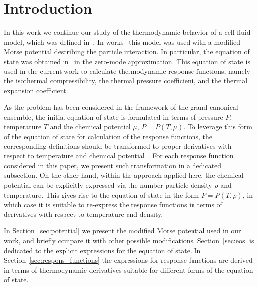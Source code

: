 \section{Introduction}

In this work we continue our study of the thermodynamic behavior of a cell fluid model, which was defined in~\cite{KozitskyKozlovskiiDobush2018book,KozitskyKozlovskiiDobush2020}. In works~\cite{KozlovskiiDobush2020,PylyukDobush2020,PylyukEtAlJML2023,PylyukKozlovskiiDobushUJP2023b} this model was used with a modified Morse potential describing the particle interaction. In particular, the equation of state was obtained in~\cite{KozlovskiiDobush2020} in the zero-mode approximation. This equation of state is used in the current work to calculate thermodynamic response functions, namely the isothermal compressibility, the thermal pressure coefficient, and the thermal expansion coefficient. 

As the problem has been considered in the framework of the grand canonical ensemble, the initial equation of state is formulated in terms of pressure $P$, temperature $T$ and the chemical potential $\mu$, $P = P(T,\mu)$. To leverage this form of the equation of state for calculation of the response functions, the corresponding definitions should be transformed to proper derivatives with respect to temperature and chemical potential~\cite{StrokerMeier2021}. For each response function considered in this paper, we present such transformation in a dedicated subsection. On the other hand, within the approach applied here, the chemical potential can be explicitly expressed via the number particle density $\rho$ and temperature. This gives rise to the equation of state in the form $P = P(T, \rho)$, in which case it is suitable to re-express the response functions in terms of derivatives with respect to temperature and density.

In Section~\ref{sec:potential} we present the modified Morse potential used in our work, and briefly compare it with other possible modifications. Section~\ref{sec:eos} is dedicated to the explicit expressions for the equation of state. In Section~\ref{sec:respons_functions} the expressions for response functions are derived in terms of thermodynamic derivatives suitable for different forms of the equation of state.


